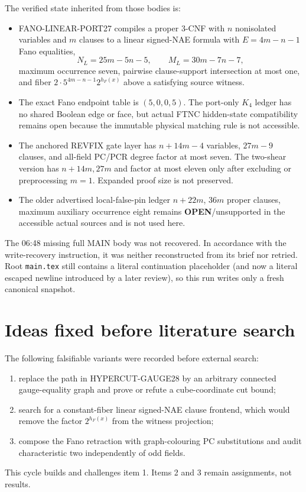 \documentclass[11pt]{article}
\newcommand{\Open}{\textbf{OPEN}}
\begin{document}
The verified state inherited from those bodies is:
\begin{itemize}
\item FANO-LINEAR-PORT27 compiles a proper 3-CNF with $n$ nonisolated
variables and $m$ clauses to a linear signed-NAE formula with
$E=4m-n-1$ Fano equalities,
\[
N_L=25m-5n-5,\qquad M_L=30m-7n-7,
\]
maximum occurrence seven, pairwise clause-support intersection at most one,
and fiber $2\cdot5^{4m-n-1}2^{h_F(x)}$ above a satisfying source witness.
\item The exact Fano endpoint table is $(5,0,0,5)$.  The port-only $K_4$
ledger has no shared Boolean edge or face, but actual FTNC hidden-state
compatibility remains open because the immutable physical matching rule is
not accessible.
\item The anchored REVFIX gate layer has $n+14m-4$ variables, $27m-9$
clauses, and all-field PC/PCR degree factor at most seven.  The two-shear
version has $n+14m,27m$ and factor at most eleven only after excluding or
preprocessing $m=1$.  Expanded proof size is not preserved.
\item The older advertised local-false-pin ledger $n+22m$, $36m$ proper
clauses, maximum auxiliary occurrence eight remains \Open/unsupported in the
accessible actual sources and is not used here.
\end{itemize}

The 06:48 missing full MAIN body was not recovered.  In accordance with the
write-recovery instruction, it was neither reconstructed from its brief nor
retried.  Root \texttt{main.tex} still contains a literal continuation
placeholder (and now a literal escaped newline introduced by a later review),
so this run writes only a fresh canonical snapshot.

\section{Ideas fixed before literature search}
The following falsifiable variants were recorded before external search:
\begin{enumerate}
\item replace the path in HYPERCUT-GAUGE28 by an arbitrary connected
gauge-equality graph and prove or refute a cube-coordinate cut bound;
\item search for a constant-fiber linear signed-NAE clause frontend, which
would remove the factor $2^{h_F(x)}$ from the witness projection;
\item compose the Fano retraction with graph-colouring PC substitutions and
audit characteristic two independently of odd fields.
\end{enumerate}
This cycle builds and challenges item 1.  Items 2 and 3 remain assignments,
not results.
\end{document}
